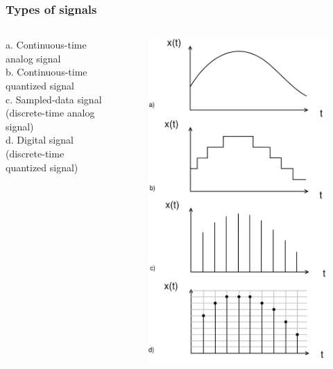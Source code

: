 \begin{frame}
	\frametitle{Types of signals}
	\begin{columns}
		a. Continuous-time analog signal\\
		\medskip
		b. Continuous-time quantized signal\\
		\medskip
		c. Sampled-data signal (discrete-time analog signal)\\
		\medskip
		d. Digital signal (discrete-time quantized signal)
		\vspace{-2ex}
		\begin{figure}
			\includegraphics[width=0.8\linewidth]{types}
		\end{figure}
	\end{columns}
\end{frame}

